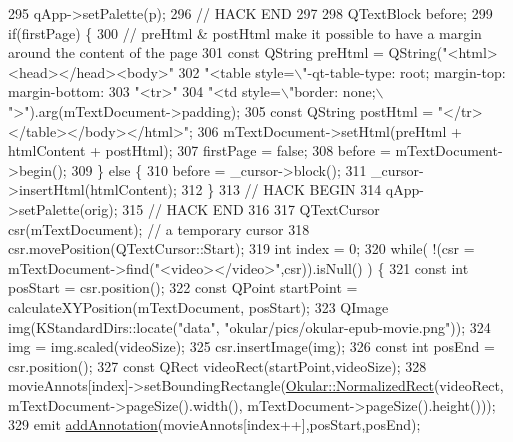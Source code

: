\begin{DoxyCode}
{295       qApp->setPalette(p);
296       \textcolor{comment}{// HACK END}
297 
298       QTextBlock before;
299       \textcolor{keywordflow}{if}(firstPage) \{
300         \textcolor{comment}{// preHtml & postHtml make it possible to have a margin around the content of the page}
301         \textcolor{keyword}{const} QString preHtml = QString(\textcolor{stringliteral}{"<html><head></head><body>"}
302                                         \textcolor{stringliteral}{"<table style=\(\backslash\)"-qt-table-type: root; margin-top:%
       margin-bottom:%
303                                         \textcolor{stringliteral}{"<tr>"}
304                                         \textcolor{stringliteral}{"<td style=\(\backslash\)"border: none;\(\backslash\)">"}).arg(mTextDocument->padding);
305         \textcolor{keyword}{const} QString postHtml = \textcolor{stringliteral}{"</tr></table></body></html>"};
306         mTextDocument->setHtml(preHtml + htmlContent + postHtml);
307         firstPage = \textcolor{keyword}{false};
308         before = mTextDocument->begin();
309       \} \textcolor{keywordflow}{else} \{
310         before = \_cursor->block();
311         \_cursor->insertHtml(htmlContent);
312       \}
313       \textcolor{comment}{// HACK BEGIN}
314       qApp->setPalette(orig);
315       \textcolor{comment}{// HACK END}
316 
317       QTextCursor csr(mTextDocument);   \textcolor{comment}{// a temporary cursor}
318       csr.movePosition(QTextCursor::Start);
319       \textcolor{keywordtype}{int} index = 0;
320       \textcolor{keywordflow}{while}( !(csr = mTextDocument->find(\textcolor{stringliteral}{"<video></video>"},csr)).isNull() ) \{
321         \textcolor{keyword}{const} \textcolor{keywordtype}{int} posStart = csr.position();
322         \textcolor{keyword}{const} QPoint startPoint = calculateXYPosition(mTextDocument, posStart);
323         QImage img(KStandardDirs::locate(\textcolor{stringliteral}{"data"}, \textcolor{stringliteral}{"okular/pics/okular-epub-movie.png"}));
324         img = img.scaled(videoSize);
325         csr.insertImage(img);
326         \textcolor{keyword}{const} \textcolor{keywordtype}{int} posEnd = csr.position();
327         \textcolor{keyword}{const} QRect videoRect(startPoint,videoSize);
328         movieAnnots[index]->setBoundingRectangle(\hyperlink{classOkular_1_1NormalizedRect}{Okular::NormalizedRect}(videoRect,
      mTextDocument->pageSize().width(), mTextDocument->pageSize().height()));
329         emit \hyperlink{classOkular_1_1TextDocumentConverter_ab0291a2187c35bda6dd37c78e5642a1b}{addAnnotation}(movieAnnots[index++],posStart,posEnd);
}}
\end{DoxyCode}
